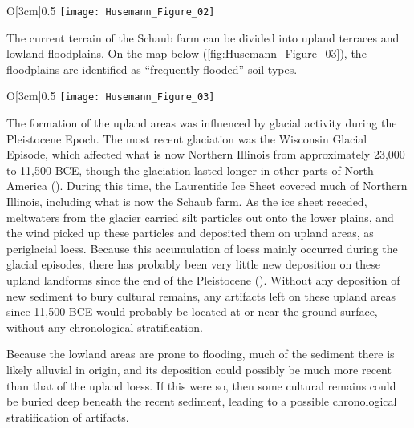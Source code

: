 \begin{wrapfigure}{O}[3cm]{0.5\textwidth}
	\texttt{[image: Husemann\_Figure\_02]}
	\caption{Map of ecological regions near Schaub farm
		{\normalfont\scriptsize \\ \copyright\ by Bradley Husemann
	}}
	\label{fig:Husemann_Figure_02}
\end{wrapfigure}

The current terrain of the Schaub farm can be divided into upland terraces and lowland floodplains. On the map below (\cref{fig:Husemann_Figure_03}), the floodplains are identified as “frequently flooded” soil types.

\begin{wrapfigure}[15]{O}[3cm]{0.5\textwidth}
	\texttt{[image: Husemann\_Figure\_03]}
	\caption{Map of soil types within Schaub farm
		{\normalfont\scriptsize \\ \copyright\ by Bradley Husemann
	}}
	\label{fig:Husemann_Figure_03}
\end{wrapfigure}

The formation of the upland areas was influenced by glacial activity during the Pleistocene Epoch. The most recent glaciation was the Wisconsin Glacial Episode, which affected what is now Northern Illinois from approximately 23,000 to 11,500 BCE, though the glaciation lasted longer in other parts of North America (\cite{ehlers2004}). During this time, the Laurentide Ice Sheet covered much of Northern Illinois, including what is now the Schaub farm. As the ice sheet receded, meltwaters from the glacier carried silt particles out onto the lower plains, and the wind picked up these particles and deposited them on upland areas, as periglacial loess. Because this accumulation of loess mainly occurred during the glacial episodes, there has probably been very little new deposition on these upland landforms since the end of the Pleistocene (\cite{carroll1970}). Without any deposition of new sediment to bury cultural remains, any artifacts left on these upland areas since 11,500 BCE would probably be located at or near the ground surface, without any chronological stratification.

Because the lowland areas are prone to flooding, much of the sediment there is likely alluvial in origin, and its deposition could possibly be much more recent than that of the upland loess. If this were so, then some cultural remains could be buried deep beneath the recent sediment, leading to a possible chronological stratification of artifacts.

